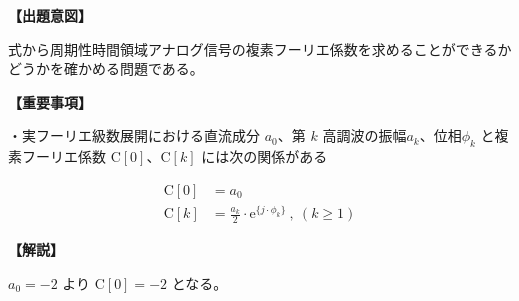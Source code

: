 \noindent \textbf{【出題意図】}

\bigskip
\noindent 式から周期性時間領域アナログ信号の複素フーリエ係数を求めることができるかどうかを確かめる問題である。

\vspace{1em}
\noindent \textbf{【重要事項】}

\medskip
\noindent・実フーリエ級数展開における直流成分 $a_0$、第 $k$ 高調波の振幅$a_k$、位相$\phi_k$ と複素フーリエ係数 $\textrm{C}[0]$、$\textrm{C}[k]$ には次の関係がある

\begin{align*}
\textrm{C}[0] &= a_0 \\
\textrm{C}[k] &= \frac{a_k}{2} \cdot \textrm{e}^{\{j \cdot \phi_k \}} \ ,\ (k\geq 1)
\end{align*}


\bigskip

\vspace{1em}
\noindent \textbf{【解説】}

\bigskip
\noindent $a_0 = -2$ より $\textrm{C}[0] = -2$ となる。
